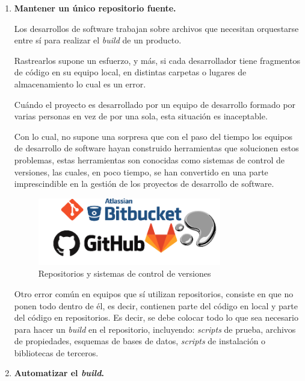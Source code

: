\begin{enumerate}
\item \textbf{Mantener un único repositorio fuente.}

Los desarrollos de software trabajan sobre archivos que necesitan orquestarse entre sí para realizar el \textit{build} de un producto. 

Rastrearlos supone un esfuerzo, y más, si cada desarrollador tiene fragmentos de código en su equipo local, en distintas carpetas o lugares de almacenamiento lo cual es un error.

Cuándo el proyecto es desarrollado por un equipo de desarrollo formado por varias personas en vez de por una sola, esta situación es inaceptable.

Con lo cual, no supone una sorpresa que con el paso del tiempo los equipos de desarrollo de software hayan construido herramientas que solucionen estos problemas, estas herramientas son conocidas como sistemas de control de versiones, las cuales, en poco tiempo, se han convertido en una parte imprescindible en la gestión de los proyectos de desarrollo de software.

\begin{figure}[!h]
\centering
   \includegraphics[width=8cm]{Repositorios_SCV.png}
\caption{Repositorios y sistemas de control de versiones}
\end{figure}

Otro error común en equipos que sí utilizan repositorios, consiste en que no ponen todo dentro de él, es decir, contienen parte del código en local y parte del código en repositorios. Es decir, se debe colocar todo lo que sea necesario para hacer un \textit{build} en el repositorio, incluyendo: \textit{scripts} de prueba, archivos de propiedades, esquemas de bases de datos, \textit{scripts} de instalación o bibliotecas de terceros.


\item \textbf{Automatizar el \textit{build}.}


\end{enumerate}
